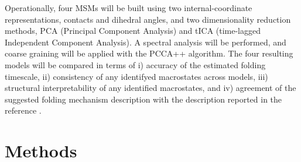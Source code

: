 \documentclass[prl,twocolumn]{revtex4-1}
\begin{document}
Operationally, four MSMs will be built using two internal-coordinate representations, contacts and dihedral angles, and two dimensionality reduction methods, PCA (Principal Component Analysis) and tICA (time-lagged Independent Component Analysis). A spectral analysis will be performed, and coarse graining will be applied with the PCCA++ algorithm. The four resulting models will be compared
in terms of i) accuracy of the estimated folding timescale, ii) consistency of any identifyed macrostates across models, iii) structural interpretability of any identified macrostates, and iv) agreement of the suggested folding mechanism description with the description reported in the reference \cite{hierarchical_hp35}.

%
%
\section{Methods}
%
\end{document}

